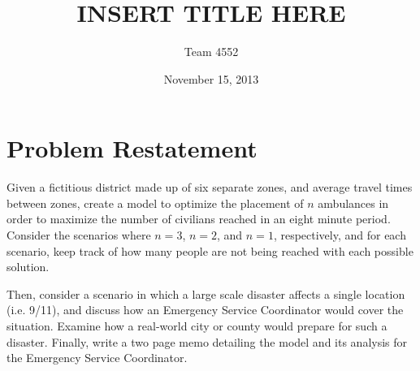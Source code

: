 \documentclass[notitlepage, 12pt]{article}
\title{\textbf{INSERT TITLE HERE}}
\author{Team 4552}
\date{November 15, 2013}
\begin{document}
\maketitle

\tableofcontents
\newpage
\section{Problem Restatement}
Given a fictitious district made up of six separate zones, and average travel times between zones, create a model to optimize the placement of $n$ ambulances in order to maximize the number of civilians reached in an eight minute period. Consider the scenarios where $n = 3$, $n = 2$, and $n = 1$, respectively, and for each scenario, keep track of how many people are not being reached with each possible solution.

Then, consider a scenario in which a large scale disaster affects a single location (i.e. 9/11), and discuss how an Emergency Service Coordinator would cover the situation. Examine how a real-world city or county would prepare for such a disaster. Finally, write a two page memo detailing the model and its analysis for the Emergency Service Coordinator.
\end{document}
